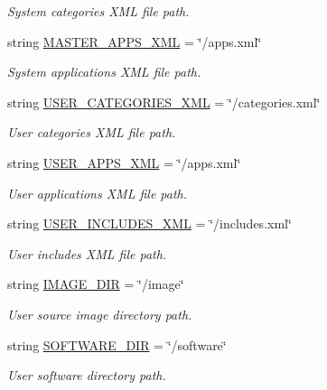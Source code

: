 \begin{CompactItemize}
\begin{CompactList}\small\item\em System categories XML file path. \item\end{CompactList}\item 
string \hyperlink{namespacewinsol_a0bf1d73390881ffdffdc95bee515f38}{MASTER\_\-APPS\_\-XML} = \char`\"{}/apps.xml\char`\"{}
\begin{CompactList}\small\item\em System applications XML file path. \item\end{CompactList}\item 
string \hyperlink{namespacewinsol_329896e2d91a81d585750db3b5019e3a}{USER\_\-CATEGORIES\_\-XML} = \char`\"{}/categories.xml\char`\"{}
\begin{CompactList}\small\item\em User categories XML file path. \item\end{CompactList}\item 
string \hyperlink{namespacewinsol_c33a1cb562b690cab5c72abf5dc6889a}{USER\_\-APPS\_\-XML} = \char`\"{}/apps.xml\char`\"{}
\begin{CompactList}\small\item\em User applications XML file path. \item\end{CompactList}\item 
string \hyperlink{namespacewinsol_f5b54eec64d2e3ce6c6b15a1fbc615dd}{USER\_\-INCLUDES\_\-XML} = \char`\"{}/includes.xml\char`\"{}
\begin{CompactList}\small\item\em User includes XML file path. \item\end{CompactList}\item 
string \hyperlink{namespacewinsol_c38909a4db335a6aac960e8eb9134338}{IMAGE\_\-DIR} = \char`\"{}/image\char`\"{}
\begin{CompactList}\small\item\em User source image directory path. \item\end{CompactList}\item 
string \hyperlink{namespacewinsol_5d62034814a3e2376f045046fb8e597d}{SOFTWARE\_\-DIR} = \char`\"{}/software\char`\"{}
\begin{CompactList}\small\item\em User software directory path. \item\end{CompactList}\item 

\end{CompactItemize}
